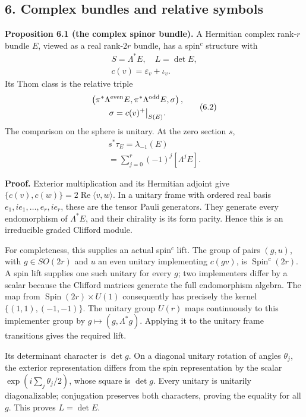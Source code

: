\documentclass[
  11pt,
]{article}
\begin{document}
\subsection{6. Complex bundles and relative
symbols}\label{complex-bundles-and-relative-symbols}

\textbf{Proposition 6.1 (the complex spinor bundle).} A Hermitian
complex rank-\(r\) bundle \(E\), viewed as a real rank-\(2r\) bundle,
has a spin\(^{c}\) structure with \[
\begin{gathered}
S=\Lambda^*E,\quad L=\det E,\\
c(v)=\varepsilon_v+\iota_v.
\end{gathered}
\tag{6.1}
\] Its Thom class is the relative triple \[
\begin{gathered}
\left(\pi^*\Lambda^{\rm even}E,\pi^*\Lambda^{\rm odd}E,\sigma\right),\\
\sigma=c(v)^+\big|_{S(E)}.
\end{gathered}
\tag{6.2}
\] The comparison on the sphere is unitary. At the zero section \(s\),
\[
\begin{gathered}
s^*\tau_E=\lambda_{-1}(E)\\
=\sum_{j=0}^r(-1)^j[\Lambda^jE].
\end{gathered}
\tag{6.3}
\]

\textbf{Proof.} Exterior multiplication and its Hermitian adjoint give
\(\{c(v),c(w)\}=2\operatorname{Re}\langle v,w\rangle\). In a unitary
frame with ordered real basis \(e_1,ie_1,\ldots,e_r,ie_r\), these are
the tensor Pauli generators. They generate every endomorphism of
\(\Lambda^*E\), and their chirality is its form parity. Hence this is an
irreducible graded Clifford module.

For completeness, this supplies an actual spin\(^{c}\) lift. The group
of pairs \((g,u)\), with \(g\in SO(2r)\) and \(u\) an even unitary
implementing \(c(gv)\), is \(\operatorname{Spin}^{c}(2r)\). A spin lift
supplies one such unitary for every \(g\); two implementers differ by a
scalar because the Clifford matrices generate the full endomorphism
algebra. The map from \(\operatorname{Spin}(2r)\times U(1)\)
consequently has precisely the kernel \(\{(1,1),(-1,-1)\}\). The unitary
group \(U(r)\) maps continuously to this implementer group by
\(g\mapsto(g,\Lambda^*g)\). Applying it to the unitary frame transitions
gives the required lift.

Its determinant character is \(\det g\). On a diagonal unitary rotation
of angles \(\theta_j\), the exterior representation differs from the
spin representation by the scalar \(\exp(i\sum_j\theta_j/2)\), whose
square is \(\det g\). Every unitary is unitarily diagonalizable;
conjugation preserves both characters, proving the equality for all
\(g\). This proves \(L=\det E\).
\end{document}
